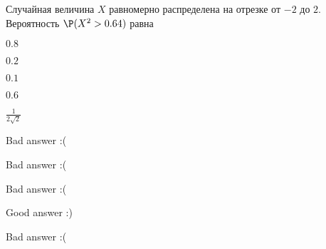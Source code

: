 
\begin{question}
Случайная величина \(X\) равномерно распределена на отрезке от \(-2\) до
\(2\). Вероятность \(\P(X^2>0.64)\) равна
\begin{answerlist}
  \item \(0.8\)
  \item \(0.2\)
  \item \(0.1\)
  \item \(0.6\)
  \item \(\frac{1}{2\sqrt{2}}\)
\end{answerlist}
\end{question}

\begin{solution}
\begin{answerlist}
  \item Bad answer :(
  \item Bad answer :(
  \item Bad answer :(
  \item Good answer :)
  \item Bad answer :(
\end{answerlist}
\end{solution}

